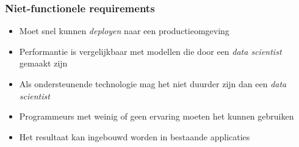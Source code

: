 \subsubsection{Niet-functionele requirements}
\label{subsubsec:nfr}

\begin{itemize}
    \item Moet snel kunnen \textit{deployen} naar een productieomgeving
    \item Performantie is vergelijkbaar met modellen die door een \textit{data scientist} gemaakt zijn
    \item Als ondersteunende technologie mag het niet duurder zijn dan een \textit{data scientist}
    \item Programmeurs met weinig of geen ervaring moeten het kunnen gebruiken
    \item Het resultaat kan ingebouwd worden in bestaande applicaties
\end{itemize}
